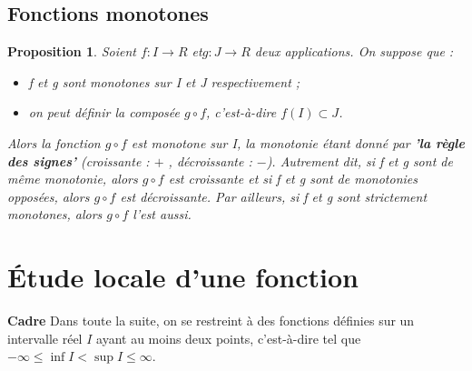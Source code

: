 \documentclass[12pt]{book}
\theoremstyle{definition}\newtheorem{dfn}{Définition}[chapter]
\theoremstyle{plain}\newtheorem{thm}{Théorème}[chapter]
\theoremstyle{plain}\newtheorem{prp}{Proposition}[chapter]
\theoremstyle{plain}\newtheorem{lem}{\bf Lemme}[chapter]
\theoremstyle{plain}\newtheorem{axm}{\bf Axiome}[chapter]
\theoremstyle{plain}\newtheorem{lmm}{\bf Lemme}[chapter]
\theoremstyle{plain}\newtheorem{cor}{\bf Corollaire}[chapter]
\theoremstyle{remark}\newtheorem{rem}{Remarque}[chapter]
\begin{document}
\section{Fonctions monotones}

\begin{prp}
Soient $f : I\rightarrow R$ et$ g : J \rightarrow R$ deux applications. On suppose que :
\begin{itemize}
\item f et g sont monotones sur I et J respectivement ;

\item on peut définir la composée $g\circ f$, c'est-à-dire $f(I) \subset J$.
\end{itemize}

Alors la fonction $g\circ f$ est monotone sur I, la monotonie étant donné par \textbf{'la règle des signes'} (croissante : $+$ ,
décroissante : $-$). Autrement dit, si f et g sont de même monotonie, alors $g\circ f$ est croissante et si f et g sont de monotonies opposées, alors  $g\circ f$ est décroissante.
Par ailleurs, si f et g sont strictement monotones, alors  $g\circ f$ l'est aussi.

\end{prp}

\chapter{Étude locale d'une fonction}
\textbf{Cadre} Dans toute la suite, on se restreint à des fonctions définies sur un intervalle réel $I$ ayant au moins deux points, c'est-à-dire tel que $-\infty\le \inf I < \sup I\le \infty$.
\end{document}
